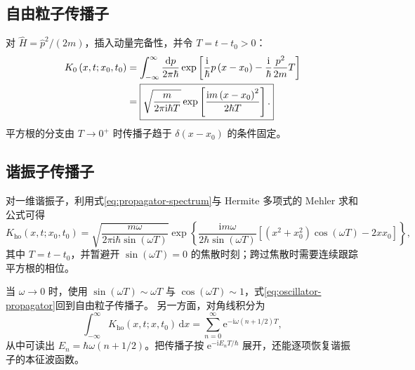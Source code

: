 \subsection{自由粒子传播子}
对 $\hat H=\hat p^2/\left(2m\right)$，插入动量完备性，并令 $T=t-t_0>0$：
\begin{align}
K_0\left(x,t;x_0,t_0\right)
&=\int_{-\infty}^{\infty}\frac{\mathrm{d}p}{2\pi\hbar}
\exp\left[\frac{\mathrm{i}}{\hbar}p\left(x-x_0\right)
-\frac{\mathrm{i}}{\hbar}\frac{p^2}{2m}T\right]\notag\\
&=\boxed{\sqrt{\frac{m}{2\pi\mathrm{i}\hbar T}}
\exp\left[\frac{\mathrm{i}m\left(x-x_0\right)^2}{2\hbar T}\right].}
\label{eq:free-propagator}
\end{align}
平方根的分支由 $T\to0^+$ 时传播子趋于 $\delta\left(x-x_0\right)$ 的条件固定。

\subsection{谐振子传播子}
对一维谐振子，利用式\eqref{eq:propagator-spectrum}与 Hermite 多项式的 Mehler 求和公式可得
\begin{equation}
\boxed{
K_{\mathrm{ho}}\left(x,t;x_0,t_0\right)
=\sqrt{\frac{m\omega}{2\pi\mathrm{i}\hbar\sin\left(\omega T\right)}}
\exp\left\{\frac{\mathrm{i}m\omega}{2\hbar\sin\left(\omega T\right)}
\left[\left(x^2+x_0^2\right)\cos\left(\omega T\right)-2xx_0\right]\right\},
}
\label{eq:oscillator-propagator}
\end{equation}
其中 $T=t-t_0$，并暂避开 $\sin\left(\omega T\right)=0$ 的焦散时刻；跨过焦散时需要连续跟踪平方根的相位。

当 $\omega\to0$ 时，使用 $\sin\left(\omega T\right)\sim\omega T$ 与
$\cos\left(\omega T\right)\sim1$，式\eqref{eq:oscillator-propagator}回到自由粒子传播子。
另一方面，对角线积分为
\begin{equation}
\int_{-\infty}^{\infty}K_{\mathrm{ho}}\left(x,t;x,t_0\right)\,\mathrm{d}x
=\sum_{n=0}^{\infty}\mathrm{e}^{-\mathrm{i}\omega\left(n+1/2\right)T},
\end{equation}
从中可读出 $E_n=\hbar\omega\left(n+1/2\right)$。把传播子按
$\mathrm{e}^{-\mathrm{i}E_n T/\hbar}$ 展开，还能逐项恢复谐振子的本征波函数。
